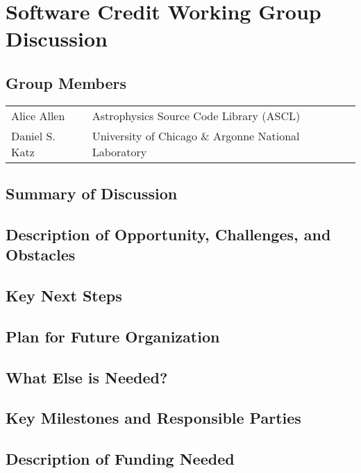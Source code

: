 
\section{Software Credit Working Group Discussion}

\subsection{Group Members}
{\small
\begin{longtable}{ll}
   Alice Allen           &  Astrophysics Source Code Library (ASCL)
\\ Daniel S. Katz        &  University of Chicago \& Argonne National Laboratory
\end{longtable}
}

\subsection{Summary of Discussion}

\subsection{Description of Opportunity, Challenges, and Obstacles}


\subsection{Key Next Steps}


\subsection{Plan for Future Organization}


\subsection{What Else is Needed?}


\subsection{Key Milestones and Responsible Parties}


\subsection{Description of Funding Needed}
